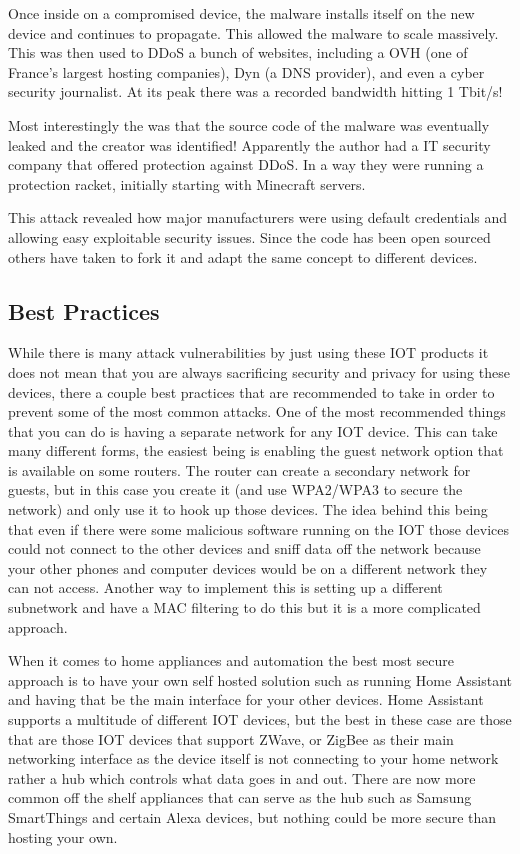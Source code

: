 \documentclass[acmlarge]{acmart}
\begin{document}
Once inside on a compromised device, the malware installs itself on the new device and continues to propagate. This allowed the malware to scale massively. This was then used to DDoS a bunch of websites, including a OVH (one of France's largest hosting companies), Dyn (a DNS provider), and even a cyber security journalist. At its peak there was a recorded bandwidth hitting 1 Tbit/s!\cite{Hertzberg_Mirai_2016}

Most interestingly the was that the source code of the malware was eventually leaked and the creator was identified! Apparently the author had a IT security company that offered protection against DDoS. In a way they were running a protection racket, initially starting with Minecraft servers.

This attack revealed how major manufacturers were using default credentials and allowing easy exploitable security issues. Since the code has been open sourced others have taken to fork it and adapt the same concept to different devices.

\subsection{Best Practices}

While there is many attack vulnerabilities by just using these IOT products it does not mean that you are always sacrificing security and privacy for using these devices, there a couple best practices that are recommended to take in order to prevent some of the most common attacks. One of the most recommended things that you can do is having a separate network for any IOT device. This can take many different forms, the easiest being is enabling the guest network option that is available on some routers. The router can create a secondary network for guests, but in this case you create it (and use WPA2/WPA3 to secure the network) and only use it to hook up those devices. The idea behind this being that even if there were some malicious software running on the IOT those devices could not connect to the other devices and sniff data off the network because your other phones and computer devices would be on a different network they can not access. Another way to implement this is setting up a different subnetwork and have a MAC filtering to do this but it is a more complicated approach. 

When it comes to home appliances and automation the best most secure approach is to have your own self hosted solution such as running Home Assistant and having that be the main interface for your other devices. Home Assistant supports a multitude of different IOT devices, but the best in these case are those that are those IOT devices that support ZWave, or ZigBee as their main networking interface as the device itself is not connecting to your home network rather a hub which controls what data goes in and out. There are now more common off the shelf appliances that can serve as the hub such as Samsung SmartThings and certain Alexa devices, but nothing could be more secure than hosting your own.
\end{document}
